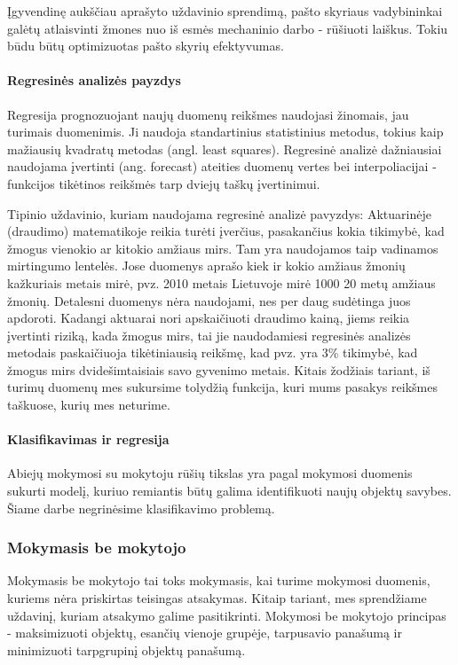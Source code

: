 Įgyvendinę aukščiau aprašyto uždavinio sprendimą, pašto skyriaus vadybininkai
galėtų atlaisvinti žmones nuo iš esmės mechaninio darbo - rūšiuoti laiškus.
Tokiu būdu būtų optimizuotas pašto skyrių efektyvumas.

\paragraph{Regresinės analizės payzdys}

Regresija prognozuojant naujų duomenų reikšmes naudojasi žinomais, jau turimais
duomenimis. Ji naudoja standartinius statistinius metodus, tokius kaip mažiausių
kvadratų metodas (angl. least squares). Regresinė analizė dažniausiai naudojama
įvertinti (ang. forecast) ateities duomenų vertes bei interpoliacijai -
funkcijos tikėtinos reikšmės tarp dviejų taškų įvertinimui.

Tipinio uždavinio, kuriam naudojama regresinė analizė pavyzdys: Aktuarinėje
(draudimo) matematikoje reikia turėti įverčius, pasakančius kokia tikimybė, kad
žmogus vienokio ar kitokio amžiaus mirs. Tam yra naudojamos taip vadinamos 
mirtingumo lentelės. Jose duomenys aprašo kiek ir kokio amžiaus žmonių
kažkuriais metais mirė, pvz. 2010 metais Lietuvoje mirė 1000 20 metų amžiaus 
žmonių. Detalesni duomenys nėra naudojami, nes per daug sudėtinga juos apdoroti.
Kadangi aktuarai nori apskaičiuoti draudimo kainą, jiems reikia įvertinti
riziką, kada žmogus mirs, tai jie naudodamiesi regresinės analizės metodais 
paskaičiuoja tikėtiniausią reikšmę, kad pvz. yra 3\% tikimybė, kad žmogus  mirs
dvidešimtaisiais savo gyvenimo metais. Kitais žodžiais tariant, iš turimų
duomenų mes sukursime tolydžią funkcija, kuri mums pasakys reikšmes taškuose,
kurių mes neturime.

\paragraph{Klasifikavimas ir regresija}

Abiejų mokymosi su mokytoju rūšių tikslas yra pagal mokymosi duomenis sukurti
modelį, kuriuo remiantis būtų galima identifikuoti naujų objektų
savybes.\cite{markhall99} Šiame darbe negrinėsime klasifikavimo problemą.

\subsubsection{Mokymasis be mokytojo}

Mokymasis be mokytojo tai toks mokymasis, kai turime mokymosi duomenis, kuriems
nėra priskirtas teisingas atsakymas. Kitaip tariant, mes sprendžiame
uždavinį, kuriam atsakymo galime pasitikrinti. Mokymosi be mokytojo principas - 
maksimizuoti objektų, esančių vienoje grupėje, tarpusavio panašumą ir 
minimizuoti tarpgrupinį objektų panašumą.

